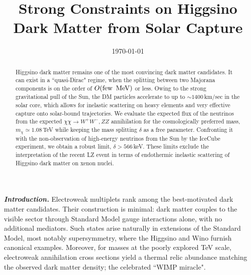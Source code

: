 \documentclass[prl,reprint,superscriptaddress]{revtex4-2}
\begin{document}




\title{Strong Constraints on Higgsino Dark Matter from Solar Capture}


\date{\today}
\begin{abstract}
Higgsino dark matter remains one of the most convincing dark matter candidates. It can exist in a ``quasi-Dirac" regime, when the splitting between two Majorana components is on the order of $O(\rm few~\,MeV)$ or less. Owing to the strong gravitational pull of the Sun, the DM particles accelerate to up to $\sim 1400$\,km/sec in the solar core, which allows for inelastic scattering on heavy elements and very effective capture onto solar-bound trajectories. We evaluate the expected flux of the neutrinos from the expected $\chi\chi \to W^+W^-,ZZ$ annihilation for the cosmologically preferred mass, $m_\chi \simeq 1.08$\,TeV while keeping the mass splitting $\delta$ as a free parameter. Confronting it with the non-observation of high-energy neutrinos from the Sun by the IceCube experiment, we obtain a robust limit, $\delta>566$\,keV. These limits exclude the interpretation of the recent LZ event in terms of endothermic inelastic scattering of Higgsino dark matter on xenon nuclei.
\end{abstract}

\maketitle
\textit{\textbf{Introduction.}}
Electroweak multiplets rank among the best-motivated dark matter candidates. Their construction is minimal: dark matter couples to the visible sector through Standard Model gauge interactions alone, with no additional mediators. Such states arise naturally in extensions of the Standard Model, most notably supersymmetry, where the Higgsino and Wino furnish canonical examples. Moreover, for masses at the poorly explored TeV scale, electroweak annihilation cross sections yield a thermal relic abundance matching the observed dark matter density; the celebrated ``WIMP miracle". 
\end{document}
